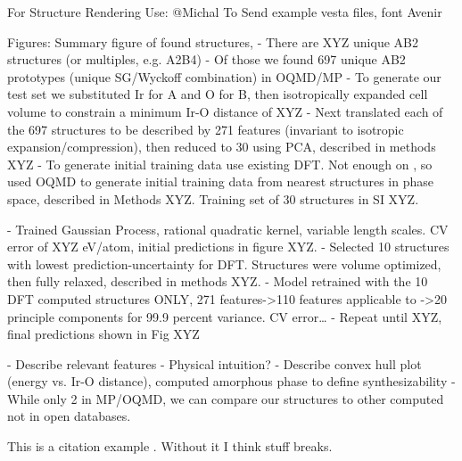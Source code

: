 For Structure Rendering Use:
@Michal To Send example vesta files, font Avenir


Figures: Summary figure of found structures,
- There are XYZ unique AB2 structures (or multiples, e.g. A2B4)
- Of those we found 697 unique AB2 prototypes (unique SG/Wyckoff combination) in OQMD/MP
- To generate our test set we substituted Ir for A and O for B, then isotropically expanded cell volume to constrain a minimum Ir-O distance of XYZ
- Next translated each of the 697 structures to be described by 271 features (invariant to isotropic expansion/compression), then reduced to 30 using PCA, described in methods XYZ
- To generate initial training data use existing DFT. Not enough on , so used OQMD to generate initial training data from nearest structures in phase space, described in Methods XYZ. Training set of 30 structures in SI XYZ.

- Trained Gaussian Process, rational quadratic kernel, variable length scales.
CV error of XYZ eV/atom, initial predictions in figure XYZ.
- Selected 10 structures with lowest prediction-uncertainty for DFT.
Structures were volume optimized, then fully relaxed, described in methods XYZ.
- Model retrained with the 10 DFT computed structures ONLY, 271 features->110 features applicable to ->20 principle components for 99.9 percent variance.
CV error…
- Repeat until XYZ, final predictions shown in Fig XYZ


- Describe relevant features
  - Physical intuition?
- Describe convex hull plot (energy vs. Ir-O distance), computed amorphous phase to define synthesizability
- While only 2  in MP/OQMD, we can compare our structures to other computed  not in open databases.

This is a citation example \cite{dummy9999}.
Without it I think stuff breaks.


